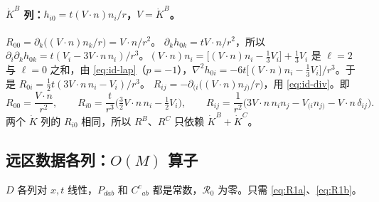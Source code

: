 \documentclass[11pt,a4paper]{ctexart}
\numberwithin{equation}{section}
\begin{document}
\paragraph{$\dot K^B$ 列：$h_{i0}=t(V\!\cdot n)n_i/r$，$V=\dot K^B$。}
$R_{00}=\partial_k\big((V\!\cdot n)n_k/r\big)=V\!\cdot n/r^2$。
$\partial_kh_{0k}=tV\!\cdot n/r^2$，所以 $\partial_i\partial_kh_{0k}=t(V_i-3V\!\cdot n\,n_i)/r^3$。$(V\!\cdot n)n_i=\big[(V\!\cdot n)n_i-\tfrac13V_i\big]+\tfrac13V_i$ 是 $\ell=2$ 与 $\ell=0$ 之和，由 \eqref{eq:id-lap}（$p=-1$），$\nabla^2h_{0i}=-6t\big[(V\!\cdot n)n_i-\tfrac13V_i\big]/r^3$。于是 $R_{0i}=\tfrac12t(3V\!\cdot n\,n_i-V_i)/r^3$。
$R_{ij}=-\partial_{(i}\big((V\!\cdot n)n_{j)}/r\big)$，用 \eqref{eq:id-div}。即
\begin{equation}
R_{00}=\frac{V\!\cdot n}{r^2},\qquad R_{i0}=\frac t{r^3}\Big(\tfrac32V\!\cdot n\,n_i-\tfrac12V_i\Big),\qquad
R_{ij}=\frac1{r^2}\big(3V\!\cdot n\,n_in_j-V_{(i}n_{j)}-V\!\cdot n\,\delta_{ij}\big).
\end{equation}
两个 $\dot K$ 列的 $R_{i0}$ 相同，所以 $R^B$、$R^C$ 只依赖 $\dot K^B+\dot K^C$。

\subsection{远区数据各列：$O(M)$ 算子}
\label{sec:Dcols}

$D$ 各列对 $x,t$ 线性，$P_{dab}$ 和 $C^c{}_{ab}$ 都是常数，$\mathcal R_0$ 为零。只需 \eqref{eq:R1a}、\eqref{eq:R1b}。
\end{document}
